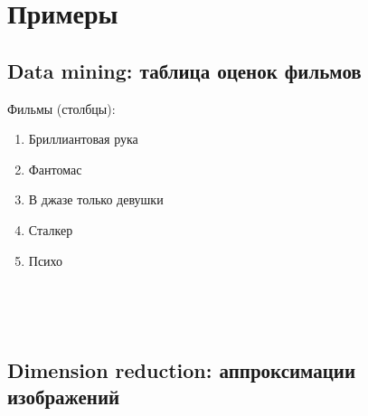 \documentclass[11pt,a4paper]{article}
\providecommand{\tightlist}{%
      \setlength{\itemsep}{0pt}\setlength{\parskip}{0pt}}
\begin{document}
    \hypertarget{ux43fux440ux438ux43cux435ux440ux44b}{%
\section{Примеры}\label{ux43fux440ux438ux43cux435ux440ux44b}}

\hypertarget{data-mining-ux442ux430ux431ux43bux438ux446ux430-ux43eux446ux435ux43dux43eux43a-ux444ux438ux43bux44cux43cux43eux432}{%
\subsection{Data mining: таблица оценок
фильмов}\label{data-mining-ux442ux430ux431ux43bux438ux446ux430-ux43eux446ux435ux43dux43eux43a-ux444ux438ux43bux44cux43cux43eux432}}

Фильмы (столбцы):

\begin{enumerate}
\def\labelenumi{\arabic{enumi}.}
\tightlist
\item
  Бриллиантовая рука
\item
  Фантомас
\item
  В джазе только девушки
\item
  Сталкер
\item
  Психо
\end{enumerate}

        
    \begin{center}
    \end{center}
    { \hspace*{\fill} \\}



    \begin{center}
    \end{center}
    { \hspace*{\fill} \\}

    \hypertarget{dimension-reduction-ux430ux43fux43fux440ux43eux43aux441ux438ux43cux430ux446ux438ux438-ux438ux437ux43eux431ux440ux430ux436ux435ux43dux438ux439}{%
\subsection{Dimension reduction: аппроксимации
изображений}\label{dimension-reduction-ux430ux43fux43fux440ux43eux43aux441ux438ux43cux430ux446ux438ux438-ux438ux437ux43eux431ux440ux430ux436ux435ux43dux438ux439}}
\end{document}
